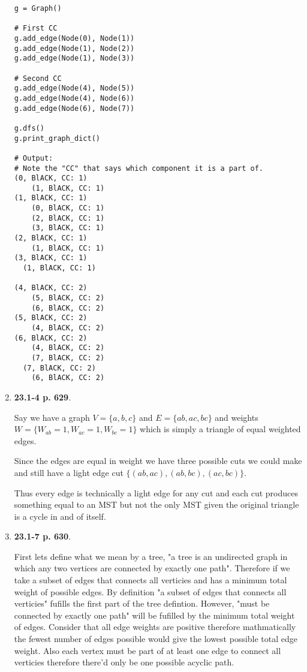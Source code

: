 \documentclass{article}
\begin{document}
\begin{enumerate}
    \begin{lstlisting}
g = Graph()

# First CC
g.add_edge(Node(0), Node(1))
g.add_edge(Node(1), Node(2))
g.add_edge(Node(1), Node(3))

# Second CC
g.add_edge(Node(4), Node(5))
g.add_edge(Node(4), Node(6))
g.add_edge(Node(6), Node(7))

g.dfs()
g.print_graph_dict()

# Output:
# Note the "CC" that says which component it is a part of.
(0, BlACK, CC: 1)
	(1, BlACK, CC: 1)
(1, BlACK, CC: 1)
	(0, BlACK, CC: 1)
	(2, BlACK, CC: 1)
	(3, BlACK, CC: 1)
(2, BlACK, CC: 1)
	(1, BlACK, CC: 1)
(3, BlACK, CC: 1)
  (1, BlACK, CC: 1)
  
(4, BlACK, CC: 2)
	(5, BlACK, CC: 2)
	(6, BlACK, CC: 2)
(5, BlACK, CC: 2)
	(4, BlACK, CC: 2)
(6, BlACK, CC: 2)
	(4, BlACK, CC: 2)
	(7, BlACK, CC: 2)
  (7, BlACK, CC: 2)
	(6, BlACK, CC: 2)
    \end{lstlisting}

    \item \textbf{23.1-4 p. 629}.
    
    Say we have a graph $V = \{a, b, c\}$ and $E = \{ab, ac, bc\}$ and weights $W = \{W_{ab} = 1, W_{ac} = 1, W_{bc} = 1\}$ which is simply a triangle of equal weighted edges.  

    Since the edges are equal in weight we have three possible cuts we could make and still have a light edge cut $\{(ab, ac), (ab, bc), (ac, bc)\}$. 

    Thus every edge is technically a light edge for any cut and each cut produces something equal to an MST but not the only MST given the original triangle is a cycle in and of itself.

    \item \textbf{23.1-7 p. 630}.
    
    First lets define what we mean by a tree, "a tree is an undirected graph in which any two vertices are connected by exactly one path". 
    Therefore if we take a subset of edges that connects all verticies and has a minimum total weight of possible edges.
    By definition "a subset of edges that connects all verticies" fufills the first part of the tree defintion. 
    However, "must be connected by exactly one path" will be fufilled by the minimum total weight of edges. Consider that all edge weights are positive therefore mathmatically the fewest number of edges possible would give the lowest possible total edge weight. 
    Also each vertex must be part of at least one edge to connect all verticies therefore there'd only be one possible acyclic path.\\


\end{enumerate}
\end{document}

